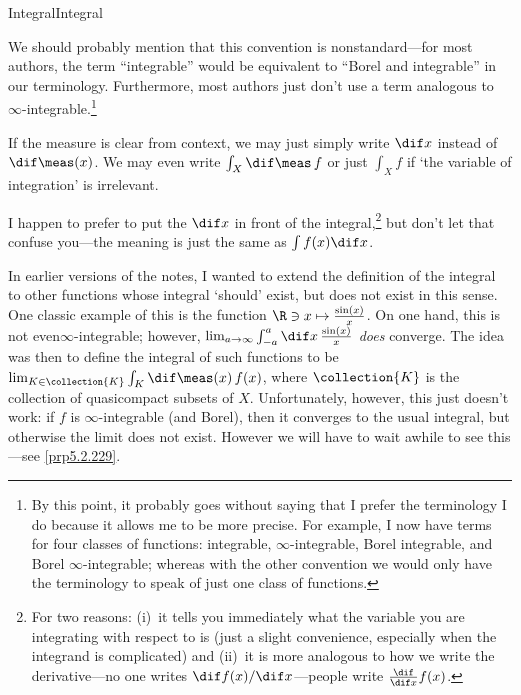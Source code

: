 \begin{dfn}{Integral}{Integral}
\begin{rmk}
\end{rmk}
\begin{rmk}
We should probably mention that this convention is nonstandard---for most authors, the term ``integrable'' would be equivalent to ``Borel and integrable'' in our terminology.  Furthermore, most authors just don't use a term analogous to $\infty$-integrable.\footnote{By this point, it probably goes without saying that I prefer the terminology I do because it allows me to be more precise.  For example, I now have terms for four classes of functions:  integrable, $\infty$-integrable, Borel integrable, and Borel $\infty$-integrable; whereas with the other convention we would only have the terminology to speak of just one class of functions.}
\end{rmk}
\begin{rmk}
If the measure is clear from context, we may just simply write $\dif x$ instead of $\dif \meas (x)$.  We may even write $\int _X\dif \meas \, f$ or just $\int _Xf$ if `the variable of integration' is irrelevant.
\end{rmk}
\begin{rmk}
I happen to prefer to put the $\dif x$ in front of the integral,\footnote{For two reasons:  (i)~it tells you immediately what the variable you are integrating with respect to is (just a slight convenience, especially when the integrand is complicated) and (ii)~it is more analogous to how we write the derivative---no one writes $\dif f(x)/\dif x$---people write $\frac{\dif}{\dif x}f(x)$.} but don't let that confuse you---the meaning is just the same as $\int f(x)\dif x$.
\end{rmk}
\begin{rmk}
In earlier versions of the notes, I wanted to extend the definition of the integral to other functions whose integral `should' exist, but does not exist in this sense.  One classic example of this is the function $\R \ni x\mapsto \frac{\sin (x)}{x}$.  On one hand, this is not even$\infty$-integrable; however, $\lim _{a\to \infty}\int _{-a}^a\dif x\, \frac{\sin (x)}{x}$ \emph{does} converge.  The idea was then to define the integral of such functions to be $\lim _{K\in \collection{K}}\int _K\dif \meas (x)\, f(x)$, where $\collection{K}$ is the collection of quasicompact subsets of $X$.  Unfortunately, however, this just doesn't work:  if $f$ is $\infty$-integrable (and Borel), then it converges to the usual integral, but otherwise the limit does not exist.  However we will have to wait awhile to see this---see \cref{prp5.2.229}.


\end{rmk}
\end{dfn}
